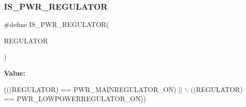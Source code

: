 \subsubsection{\texorpdfstring{I\+S\+\_\+\+P\+W\+R\+\_\+\+R\+E\+G\+U\+L\+A\+T\+OR}{IS\_PWR\_REGULATOR}}
{\footnotesize\ttfamily \#define I\+S\+\_\+\+P\+W\+R\+\_\+\+R\+E\+G\+U\+L\+A\+T\+OR(\begin{DoxyParamCaption}\item[{}]{R\+E\+G\+U\+L\+A\+T\+OR }\end{DoxyParamCaption})}

{\bfseries Value\+:}
\begin{DoxyCode}
(((REGULATOR) == PWR\_MAINREGULATOR\_ON) || \(\backslash\)
                                     ((REGULATOR) == PWR\_LOWPOWERREGULATOR\_ON))
\end{DoxyCode}
